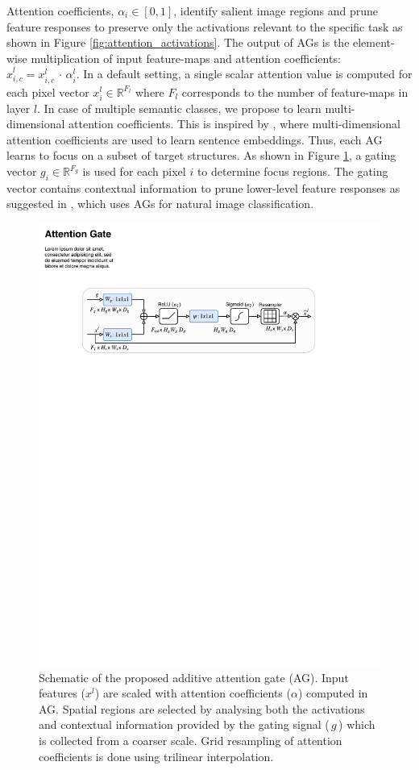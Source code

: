 \documentclass{article}
\newcommand{\R}[0]{\mathbb{R}} %
\begin{document}
Attention coefficients, $\alpha_i \in [0,1]$, identify salient image regions and prune feature responses to preserve only the activations relevant to the specific task as shown in Figure \ref{fig:attention_activations}. The output of AGs is the element-wise multiplication of input feature-maps and attention coefficients: $\hat{x}_{i,c}^l = x_{i,c}^l \,\cdot\, \alpha_{i}^l$. In a default setting, a single scalar attention value is computed for each pixel vector $x_{i}^l \in \R^{F_l}$ where $F_l$ corresponds to the number of feature-maps in layer $l$. In case of multiple semantic classes, we propose to learn multi-dimensional attention coefficients. This is inspired by \cite{shen2017disan}, where multi-dimensional attention coefficients are used to learn sentence embeddings. Thus, each AG learns to focus on a subset of target structures. As shown in Figure \ref{fig:attentionblock}, a gating vector $g_i \in \R^{F_g}$ is used for each pixel $i$ to determine focus regions. The gating vector contains contextual information to prune lower-level feature responses as suggested in \cite{wang2017residual}, which uses AGs for natural image classification.
\begin{figure}[!t]
	\centering
	\includegraphics[width=1.0\textwidth]{figure3.pdf}
	\caption{Schematic of the proposed additive attention gate (AG). Input features ($x^l$) are scaled with attention coefficients ($\alpha$) computed in AG. Spatial regions are selected by analysing both the activations and contextual information provided by the gating signal ($\,g\,$) which is collected from a coarser scale. Grid resampling of attention coefficients is done using trilinear interpolation.}
	\label{fig:attentionblock}
\end{figure}
\end{document}
